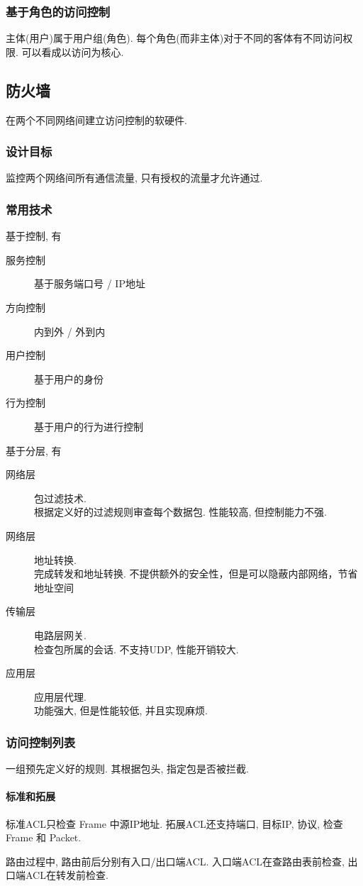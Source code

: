 \documentclass{ctexart}
\begin{document}
\subsubsection{基于角色的访问控制} 主体(用户)属于用户组(角色). 每个角色(而非主体)对于不同的客体有不同访问权限. 
    可以看成以访问为核心.

\subsection{防火墙} 在两个不同网络间建立访问控制的软硬件.
\subsubsection{设计目标} 监控两个网络间所有通信流量, 只有授权的流量才允许通过.
\subsubsection{常用技术} 基于控制, 有\begin{description}
        \item[服务控制] 基于服务端口号 / IP地址
        \item[方向控制] 内到外 / 外到内
        \item[用户控制] 基于用户的身份
        \item[行为控制] 基于用户的行为进行控制
    \end{description}基于分层, 有\begin{description}
        \item[网络层] 包过滤技术.\\ 根据定义好的过滤规则审查每个数据包. 性能较高, 但控制能力不强.
        \item[网络层] 地址转换.\\ 完成转发和地址转换. 不提供额外的安全性，但是可以隐蔽内部网络，节省地址空间
        \item[传输层] 电路层网关.\\ 检查包所属的会话. 不支持UDP, 性能开销较大.
        \item[应用层] 应用层代理.\\ 功能强大, 但是性能较低, 并且实现麻烦.
    \end{description}
\subsubsection{访问控制列表} 一组预先定义好的规则. 其根据包头, 指定包是否被拦截.
\paragraph{标准和拓展} 标准ACL只检查 Frame 中源IP地址.
    拓展ACL还支持端口, 目标IP, 协议, 检查 Frame 和 Packet.\par
    路由过程中, 路由前后分别有入口/出口端ACL. 入口端ACL在查路由表前检查, 出口端ACL在转发前检查.
\end{document}
